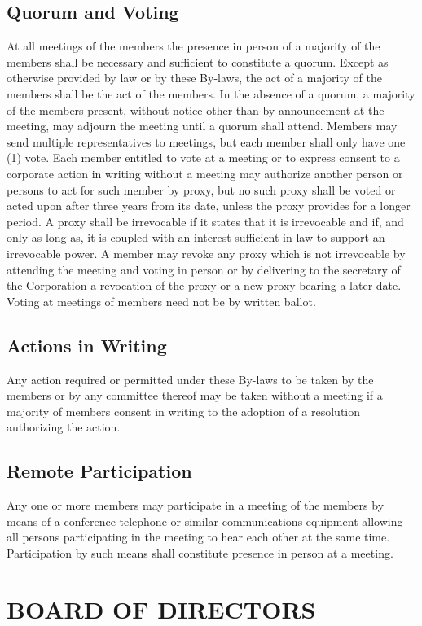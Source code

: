 \documentclass{article}
\begin{document}
\subsection{Quorum and Voting}
At all meetings of the members the presence in person of a majority of the members shall be necessary and sufficient to constitute a quorum. Except as otherwise provided by law or by these By-laws, the act of a majority of the members shall be the act of the members. In the absence of a quorum, a majority of the members present, without notice other than by announcement at the meeting, may adjourn the meeting until a quorum shall attend. Members may send multiple representatives to meetings, but each member shall only have one (1) vote. Each member entitled to vote at a meeting or to express consent to a corporate action in writing without a meeting may authorize another person or persons to act for such member by proxy, but no such proxy shall be voted or acted upon after three years from its date, unless the proxy provides for a longer period. A proxy shall be irrevocable if it states that it is irrevocable and if, and only as long as, it is coupled with an interest sufficient in law to support an irrevocable power. A member may revoke any proxy which is not irrevocable by attending the meeting and voting in person or by delivering to the secretary of the Corporation a revocation of the proxy or a new proxy bearing a later date. Voting at meetings of members need not be by written ballot.
\subsection{Actions in Writing}
Any action required or permitted under these By-laws to be taken by the members or by any committee thereof may be taken without a meeting if a majority of members consent in writing to the adoption of a resolution authorizing the action.
\subsection{Remote Participation}
Any one or more members may participate in a meeting of the members by means of a conference telephone or similar communications equipment allowing all persons participating in the meeting to hear each other at the same time.  Participation by such means shall constitute presence in person at a meeting.
\section{BOARD OF DIRECTORS}
\end{document}
